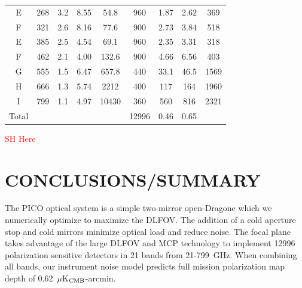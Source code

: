 \documentclass[]{spie}  %
\newcommand{\comr}[1]{\textcolor{red}{#1}}
\begin{document}
\begin{table}[ht]
\begin{tabular}{|c|c|c|c|c|c|c|cc|}
E     & 268 & 3.2  & 8.55  & 54.8    & 960   & 1.87   & 2.62 & 369    \\
F     & 321 & 2.6  & 8.16  & 77.6    & 900   & 2.73   & 3.84 & 518    \\
E     & 385 & 2.5  & 4.54  & 69.1    & 960   & 2.35   & 3.31 & 318    \\
F     & 462 & 2.1  & 4.00  & 132.6   & 900   & 4.66   & 6.56 & 403    \\
G     & 555 & 1.5  & 6.47  & 657.8   & 440   & 33.1   & 46.5 & 1569  \\
H     & 666 & 1.3  & 5.74  & 2212    & 400   & 117    & 164  & 1960 \\
I     & 799 & 1.1  & 4.97  & 10430   & 360   & 560    & 816  & 2321 \\ 
\hline
Total &     &      &       &         & 12996 & 0.46   & 0.65 &   \\
\hline
\end{tabular}
\end{table}

\comr{SH Here} 
\section{CONCLUSIONS/SUMMARY}

The PICO optical system is a simple two mirror open-Dragone which we numerically optimize to maximize the DLFOV.  The addition of a 
cold aperture stop and cold mirrors minimize optical load and reduce noise.  The focal plane takes advantage of the large DLFOV and MCP 
technology to implement 12996 polarization sensitive detectors in 21 bands from 21-799~GHz.  When combining all bands, our instrument 
noise model predicts full mission polarization map depth of 0.62~$\mu$K$_{\rm CMB}$-arcmin.




\end{document}
